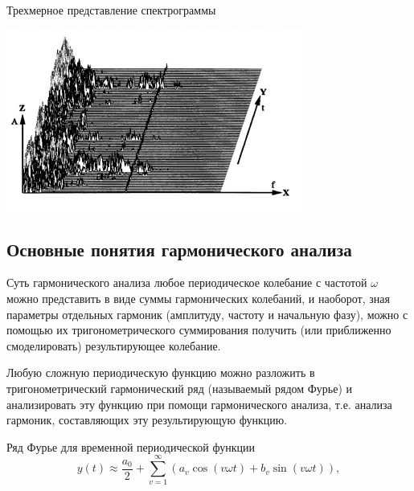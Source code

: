 \documentclass{beamer}
\begin{document}
\begin{frame}
\begin{block}{Трехмерное представление спектрограммы}
\begin{center}
\includegraphics[scale=1.0]{pic-specter-03}
\end{center}
\end{block}
\end{frame} 

\subsection{Основные понятия гармонического анализа}

\begin{frame}
\begin{block}{Суть гармонического анализа}
любое периодическое колебание с частотой \(\omega\) можно представить в виде суммы гармонических колебаний, и наоборот, зная параметры отдельных гармоник (амплитуду, частоту и начальную фазу), можно с помощью их тригонометрического суммирования получить (или приближенно смоделировать) результирующее колебание. 
\end{block}
Любую сложную периодическую функцию можно разложить в тригонометрический гармонический ряд (называемый рядом Фурье) и анализировать эту функцию при помощи гармонического анализа, т.е. анализа гармоник, составляющих эту результирующую функцию. 
\begin{block}{Ряд Фурье для временной периодической функции}
\[ y(t) \approx \frac{a_0}{2} + \sum\limits_{v=1}^{\infty}(a_v\cos(v\omega t) + b_v\sin(v\omega t)),\]
\end{block}
\end{frame}
\end{document}
